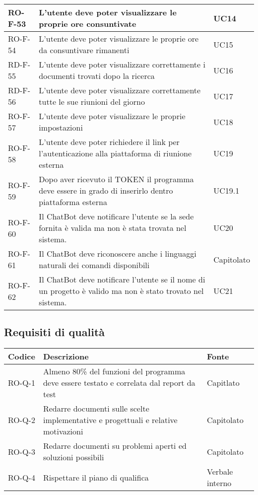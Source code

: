 \begin{center}
\begin{tabular}{ | m{8em} | m{18em} | m{12em} | }
\hline
RO-F-53&L’utente deve poter visualizzare le proprie ore consuntivate &UC14 \\
\hline
RO-F-54&L’utente deve poter visualizzare le proprie ore da consuntivare rimanenti &UC15 \\
\hline
RD-F-55&L’utente deve poter visualizzare correttamente i documenti trovati dopo la ricerca &UC16 \\
\hline
RD-F-56&L’utente deve poter visualizzare correttamente tutte le sue riunioni del giorno & UC17\\
\hline
RO-F-57&L’utente deve poter visualizzare le proprie impostazioni &UC18 \\
\hline
RO-F-58&L’utente deve poter richiedere il link per l’autenticazione alla piattaforma di riunione esterna &UC19\\
\hline
RO-F-59&Dopo aver ricevuto il TOKEN il programma deve essere in grado di inserirlo dentro piattaforma esterna &UC19.1 \\
\hline
RO-F-60&Il ChatBot deve notificare l'utente se la sede fornita è valida ma non è stata trovata nel sistema.&UC20 \\
\hline
RO-F-61&Il ChatBot deve riconoscere anche i linguaggi naturali dei comandi disponibili &Capitolato \\
\hline
RO-F-62&Il ChatBot deve notificare l'utente se il nome di un progetto è valido ma non è stato trovato nel sistema. &UC21 \\
\hline
\end{tabular}
\end{center}
\newpage

\subsection{Requisiti di qualità}
\begin{center}
\renewcommand{\arraystretch}{1.8} %
\begin{tabular}{ | m{8em} | m{18em} | m{12em} | }
\hline
Codice&Descrizione&Fonte\\
\hline
RO-Q-1&Almeno 80\% del funzioni del programma deve essere testato e correlata dal report da test&Capitlato\\
\hline
RO-Q-2&Redarre documenti sulle scelte implementative e progettuali e relative motivazioni&Capitolato\\
\hline
RO-Q-3&Redarre documenti su problemi aperti ed soluzioni possibili&Capitolato\\
\hline
RO-Q-4&Rispettare il piano di qualifica&Verbale interno\\
\hline
\end{tabular}
\end{center}


